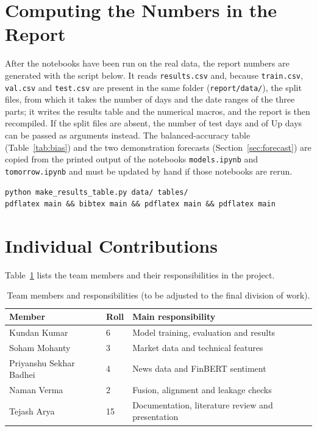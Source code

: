 \section{Computing the Numbers in the Report}
After the notebooks have been run on the real data, the report numbers are generated with the script below. It reads \texttt{results.csv} and, because \texttt{train.csv}, \texttt{val.csv} and \texttt{test.csv} are present in the same folder (\texttt{report/data/}), the split files, from which it takes the number of days and the date ranges of the three parts; it writes the results table and the numerical macros, and the report is then recompiled. If the split files are absent, the number of test days and of Up days can be passed as arguments instead. The balanced-accuracy table (Table~\ref{tab:bias}) and the two demonstration forecasts (Section~\ref{sec:forecast}) are copied from the printed output of the notebooks \texttt{models.ipynb} and \texttt{tomorrow.ipynb} and must be updated by hand if those notebooks are rerun.

\begin{lstlisting}[float=!htbp, caption={Command sequence to update the report with real results.}]
python make_results_table.py data/ tables/
pdflatex main && bibtex main && pdflatex main && pdflatex main
\end{lstlisting}

\section{Individual Contributions}
Table~\ref{tab:team} lists the team members and their responsibilities in the project.

\begin{table}[!htbp]
\centering
\small
\begin{tabularx}{\textwidth}{@{}l l X@{}}
\toprule
Member & Roll & Main responsibility \\
\midrule
Kundan Kumar & 6 & Model training, evaluation and results \\
Soham Mohanty & 3 & Market data and technical features \\
Priyanshu Sekhar Badhei & 4 & News data and FinBERT sentiment \\
Naman Verma & 2 & Fusion, alignment and leakage checks \\
Tejash Arya & 15 & Documentation, literature review and presentation \\
\bottomrule
\end{tabularx}
\caption{Team members and responsibilities (to be adjusted to the final division of work).}
\label{tab:team}
\end{table}
